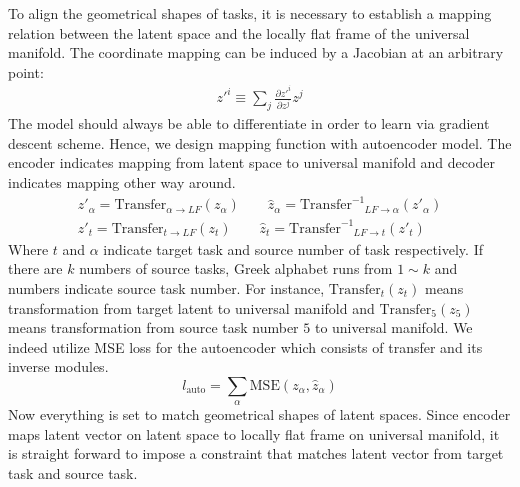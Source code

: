 To align the geometrical shapes of tasks, it is necessary to establish a mapping relation between the latent space and the locally flat frame of the universal manifold. The coordinate mapping can be induced by a Jacobian at an arbitrary point: \begin{gather}
    z'^i \equiv \sum_j \frac{\partial z'^i}{\partial z^j} z^j
\end{gather}
The model should always be able to differentiate in order to learn via gradient descent scheme. Hence, we design mapping function with autoencoder model. The encoder indicates mapping from latent space to universal manifold and decoder indicates mapping other way around.
\begin{gather} \label{transform1}
    z'_\alpha = \mathrm{Transfer}_{\alpha\rightarrow LF}(z_\alpha) \qquad    \hat{z}_\alpha = \mathrm{Transfer}^{-1}_{\phantom{-1}LF \rightarrow \alpha}(z'_\alpha)\\
    \label{transform2} z'_t = \mathrm{Transfer}_{t\rightarrow LF}(z_t) \qquad    \hat{z}_t = \mathrm{Transfer}^{-1}_{\phantom{-1}LF \rightarrow t}(z'_t)
\end{gather}
Where $t$ and $\alpha$ indicate target task and source number of task respectively. If there are $k$ numbers of source tasks, Greek alphabet runs from $1 \sim k$ and numbers indicate source task number. For instance, $\mathrm{Transfer}_{t}(z_t)$ means transformation from target latent to universal manifold and $\mathrm{Transfer}_{5}(z_5)$ means transformation from source task number $5$ to universal manifold.
We indeed utilize MSE loss for the autoencoder which consists of transfer and its inverse modules.
\begin{equation}
    l_{\mathrm{auto}} = \sum_\alpha \mathrm{MSE}(z_\alpha, \hat{z}_\alpha)
\end{equation}
Now everything is set to match geometrical shapes of latent spaces. Since encoder maps latent vector on latent space to locally flat frame on universal manifold, it is straight forward to impose a constraint that matches latent vector from target task and source task.

